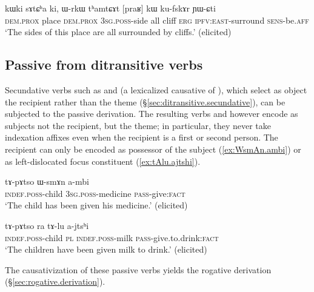 \begin{exe}
\ex \label{ex:praR.kW.kufskAr}
 \gll kɯki sɤtɕʰa ki, ɯ-rkɯ tʰamtɕɤt [praʁ] kɯ ku-fskɤr ɲɯ-ɕti \\
 \textsc{dem}.\textsc{prox} place \textsc{dem}.\textsc{prox} \textsc{3sg}.\textsc{poss}-side all cliff \textsc{erg} \textsc{ipfv}:\textsc{east}-surround \textsc{sens}-be.\textsc{aff} \\
 \glt `The sides of this place are all surrounded by cliffs.' (elicited)
 \end{exe}
 
\subsection{Passive from ditransitive verbs} \label{passive.ditransitive}
   
Secundative verbs such as  and  (a lexicalized causative of ), which select as object the recipient rather than the theme (§\ref{sec:ditransitive.secundative}), can be subjected to the passive derivation. The resulting verbs   and    however encode as subjects not the recipient, but the theme; in particular, they never take indexation affixes even when the recipient is a first or second person. The recipient can only be encoded as possessor of the subject (\ref{ex:WsmAn.ambi}) or as left-dislocated focus constituent (\ref{ex:tAlu.ajtshi}).

\begin{exe}
\ex \label{ex:WsmAn.ambi}
 \gll tɤ-pɤtso ɯ-smɤn a-mbi  \\
  \textsc{indef}.\textsc{poss}-child \textsc{3sg}.\textsc{poss}-medicine \textsc{pass}-give:\textsc{fact} \\
  \glt `The child has been given his medicine.'  (elicited)
\end{exe} 

\begin{exe}
\ex \label{ex:tAlu.ajtshi}
 \gll tɤ-pɤtso ra tɤ-lu a-jtsʰi \\
\textsc{indef}.\textsc{poss}-child \textsc{pl} \textsc{indef}.\textsc{poss}-milk \textsc{pass}-give.to.drink:\textsc{fact} \\
\glt `The children have been given milk to drink.' (elicited)
\end{exe} 
 
 The causativization of these passive verbs yields the rogative derivation (§\ref{sec:rogative.derivation}).
 
